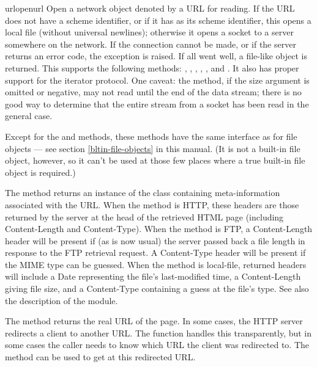 \begin{funcdesc}{urlopen}{url}
Open a network object denoted by a URL for reading.  If the URL does
not have a scheme identifier, or if it has  as its scheme
identifier, this opens a local file (without universal newlines);
otherwise it opens a socket to a server somewhere on the network.  If
the connection cannot be made, or if the server returns an error code,
the  exception is raised.  If all went well, a
file-like object is returned.  This supports the following methods:
, , , ,
,  and .  It also has
proper support for the iterator protocol.
One caveat: the  method, if the size argument is
omitted or negative, may not read until the end of the data stream;
there is no good way to determine that the entire stream from a socket
has been read in the general case.

Except for the  and  methods,
these methods have the same interface as for
file objects --- see section \ref{bltin-file-objects} in this
manual.  (It is not a built-in file object, however, so it can't be
used at those few places where a true built-in file object is
required.)

The  method returns an instance of the class
 containing meta-information associated
with the URL.  When the method is HTTP, these headers are those
returned by the server at the head of the retrieved HTML page
(including Content-Length and Content-Type).  When the method is FTP,
a Content-Length header will be present if (as is now usual) the
server passed back a file length in response to the FTP retrieval
request. A Content-Type header will be present if the MIME type can
be guessed.  When the method is local-file, returned headers will include
a Date representing the file's last-modified time, a Content-Length
giving file size, and a Content-Type containing a guess at the file's
type. See also the description of the
 module.

The  method returns the real URL of the page.  In
some cases, the HTTP server redirects a client to another URL.  The
 function handles this transparently, but in some
cases the caller needs to know which URL the client was redirected
to.  The  method can be used to get at this
redirected URL.


\end{funcdesc}
